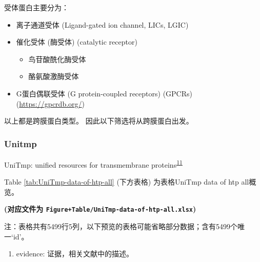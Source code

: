 \documentclass[
]{article}
\providecommand{\tightlist}{%
  \setlength{\itemsep}{0pt}\setlength{\parskip}{0pt}}
\begin{document}
受体蛋白主要分为：

\begin{itemize}
\tightlist
\item
  离子通道受体 (Ligand-gated ion channel, LICs, LGIC)
\item
  催化受体 (酶受体) (catalytic receptor)

  \begin{itemize}
  \tightlist
  \item
    鸟苷酸酰化酶受体
  \item
    酪氨酸激酶受体
  \end{itemize}
\item
  G蛋白偶联受体 (G protein-coupled receptors) (GPCRs) (\url{https://gpcrdb.org/})
\end{itemize}

以上都是跨膜蛋白类型。
因此以下筛选将从跨膜蛋白出发。

\hypertarget{unitmp}{%
\subsubsection{Unitmp}\label{unitmp}}

UniTmp: unified resources for transmembrane proteins\textsuperscript{\protect\hyperlink{ref-UnitmpUnifiedDobson2024}{11}}

Table \ref{tab:UniTmp-data-of-htp-all} (下方表格) 为表格UniTmp data of htp all概览。

\textbf{(对应文件为 \texttt{Figure+Table/UniTmp-data-of-htp-all.xlsx})}

\begin{center}\begin{tcolorbox}[colback=gray!10, colframe=gray!50, width=0.9\linewidth, arc=1mm, boxrule=0.5pt]注：表格共有5499行5列，以下预览的表格可能省略部分数据；含有5499个唯一`id'。
\end{tcolorbox}
\end{center}
\begin{center}\begin{tcolorbox}[colback=gray!10, colframe=gray!50, width=0.9\linewidth, arc=1mm, boxrule=0.5pt]\begin{enumerate}\tightlist
\item evidence:  证据，相关文献中的描述。
\end{enumerate}\end{tcolorbox}
\end{center}
\end{document}
